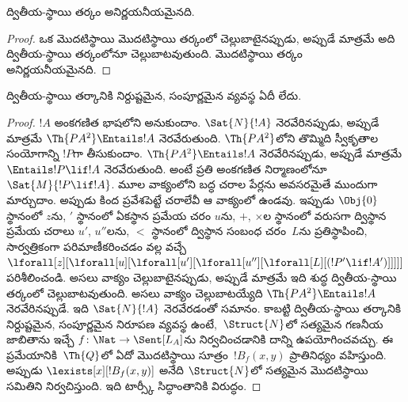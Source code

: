 \documentclass[../../../include/open-logic-section]{subfiles}
\begin{document}



\begin{thm}
ద్వితీయ-స్థాయి తర్కం అనిర్ణయనీయమైనది.
\end{thm}

\begin{proof}
ఒక మొదటిస్థాయి  మొదటిస్థాయి తర్కంలో
చెల్లుబాటైనప్పుడు, అప్పుడే మాత్రమే అది ద్వితీయ-స్థాయి తర్కంలోనూ చెల్లుబాటవుతుంది.
మొదటిస్థాయి తర్కం అనిర్ణయనీయమైనది.
\end{proof}

\begin{thm}
ద్వితీయ-స్థాయి తర్కానికి నిర్దుష్టమైన, సంపూర్ణమైన 
వ్యవస్థ ఏదీ లేదు.
\end{thm}

\begin{proof}
$!A$ అంకగణిత భాషలోని  అనుకుందాం.
$\Sat{N}{!A}$ నెరవేరినప్పుడు, అప్పుడే మాత్రమే $\Th{PA^2} \Entails !A$ నెరవేరుతుంది. $\Th{PA^2}$లోని
తొమ్మిది స్వీకృతాల సంయోగాన్ని $!P$గా తీసుకుందాం. $\Th{PA^2} \Entails !A$
నెరవేరినప్పుడు, అప్పుడే మాత్రమే $\Entails !P \lif !A$ నెరవేరుతుంది. అంటే ప్రతి అంకగణిత నిర్మాణంలోనూ
$\Sat{M}{!P \lif !A}$.
మూల వాక్యంలోని బద్ధ చరాల పేర్లను అవసరమైతే ముందుగా మార్చుదాం.
అప్పుడు కింద ప్రవేశపెట్టే చరాలేవీ ఆ వాక్యంలో ఉండవు.
ఇప్పుడు $\Obj{0}$ స్థానంలో $z$ను, $\prime$ స్థానంలో ఏకస్థాన ప్రమేయ
చరం $u$ను, $+$, $\times$ల స్థానంలో వరుసగా ద్విస్థాన ప్రమేయ చరాలు
$u'$, $u''$లను, $<$ స్థానంలో ద్విస్థాన సంబంధ చరం~$L$ను ప్రతిస్థాపించి,
సార్వత్రికంగా పరిమాణీకరించడం వల్ల వచ్చే
$\lforall[z][\lforall[u][\lforall[u'][\lforall[u''][\lforall[L][(!P' \lif !A')]]]]]$
పరిశీలించండి. అసలు వాక్యం చెల్లుబాటైనప్పుడు, అప్పుడే మాత్రమే ఇది శుద్ధ
ద్వితీయ-స్థాయి తర్కంలో చెల్లుబాటవుతుంది. అసలు వాక్యం చెల్లుబాటయ్యేది
$\Th{PA^2} \Entails !A$ నెరవేరినప్పుడే. ఇది $\Sat{N}{!A}$ నెరవేరడంతో సమానం. కాబట్టి ద్వితీయ-స్థాయి తర్కానికి నిర్దుష్టమైన,
సంపూర్ణమైన నిరూపణ వ్యవస్థ ఉంటే,~$\Struct{N}$లో సత్యమైన
 గణనీయ జాబితాను ఇచ్చే
$f\colon \Nat \to \Sent[L_A]$ను నిర్వచించడానికి దాన్ని ఉపయోగించవచ్చు.
ఈ ప్రమేయానికి~$\Th{Q}$లో ఏదో మొదటిస్థాయి సూత్రం~$!B_f(x, y)$
ప్రాతినిధ్యం వహిస్తుంది. అప్పుడు 
$\lexists[x][!B_f(x, y)]$ అనేది $\Struct{N}$లో సత్యమైన మొదటిస్థాయి
 సమితిని నిర్వచిస్తుంది. ఇది టార్స్కీ సిద్ధాంతానికి
విరుద్ధం.
\end{proof}
\end{document}
